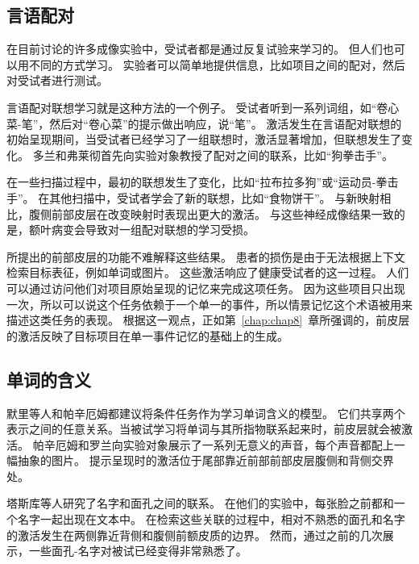 \subsection{言语配对}
\par
在目前讨论的许多成像实验中，受试者都是通过反复试验来学习的。
但人们也可以用不同的方式学习。
实验者可以简单地提供信息，比如项目之间的配对，然后对受试者进行测试。
\par


言语配对联想学习就是这种方法的一个例子。
受试者听到一系列词组，如“卷心菜-笔”，然后对“卷心菜”的提示做出响应，说“笔”。
激活发生在言语配对联想的初始呈现期间\cite{fletcher1995brain}，当受试者已经学习了一组联想时，激活显著增加，但联想发生了变化。
多兰和弗莱彻\cite{dolan1997dissociating}首先向实验对象教授了配对之间的联系，比如“狗拳击手”。
\par


在一些扫描过程中，最初的联想发生了变化，比如“拉布拉多狗”或“运动员-拳击手”。
在其他扫描中，受试者学会了新的联想，比如“食物饼干”。
与新映射相比，腹侧前部皮层在改变映射时表现出更大的激活。
与这些神经成像结果一致的是，额叶病变会导致对一组配对联想的学习受损\cite{dimitrov1999associative}。
\par


所提出的前部皮层的功能不难解释这些结果。
患者的损伤是由于无法根据上下文检索目标表征，例如单词或图片。
这些激活响应了健康受试者的这一过程。
人们可以通过访问他们对项目原始呈现的记忆来完成这项任务。
因为这些项目只出现一次，所以可以说这个任务依赖于一个单一的事件，所以情景记忆这个术语被用来描述这类任务的表现\cite{fletcher2001frontal}。
根据这一观点，正如第~\ref{chap:chap8}~章所强调的，前皮层的激活反映了目标项目在单一事件记忆的基础上的生成。
\par



\subsection{单词的含义}

默里等人\cite{murray2002arbitrary}和帕辛厄姆\cite{passingham2008special}都建议将条件任务作为学习单词含义的模型。
它们共享两个表示之间的任意关系。当被试学习将单词与其所指物联系起来时，前皮层就会被激活。
帕辛厄姆和罗兰\cite{klingberg1998right}向实验对象展示了一系列无意义的声音，每个声音都配上一幅抽象的图片。
提示呈现时的激活位于尾部靠近前部前部皮层腹侧和背侧交界处。
\par


塔斯库等人\cite{tsukiura2002neural}研究了名字和面孔之间的联系。
在他们的实验中，每张脸之前都和一个名字一起出现在文本中。
在检索这些关联的过程中，相对不熟悉的面孔和名字的激活发生在两侧靠近背侧和腹侧前额皮质的边界。
然而，通过之前的几次展示，一些面孔-名字对被试已经变得非常熟悉了。
\par


